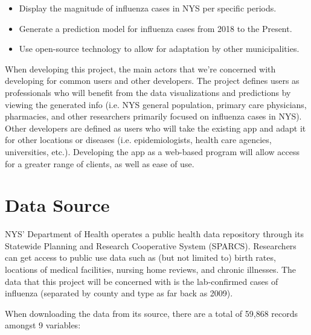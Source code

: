 \documentclass[12pt]{article}
\begin{document}
\begin{itemize}
  	\item {Display the magnitude of influenza cases in NYS per specific periods.}
  	\item {Generate a prediction model for influenza cases from 2018 to the Present.}
	\item {Use open-source technology to allow for adaptation by other municipalities.}
\end{itemize}

When developing this project, the main actors that we're concerned with developing for common users and other developers. The project defines users as professionals who will benefit from the data visualizations and predictions by viewing the generated info (i.e. NYS general population, primary care physicians, pharmacies, and other researchers primarily focused on influenza cases in NYS). Other developers are defined as users who will take the existing app and adapt it for other locations or diseases (i.e. epidemiologists, health care agencies, universities, etc.). Developing the app as a web-based program will allow access for a greater range of clients, as well as ease of use.

\section{Data Source}

NYS’ Department of Health operates a public health data repository through its Statewide Planning and Research Cooperative System (SPARCS). Researchers can get access to public use data such as (but not limited to) birth rates, locations of medical facilities, nursing home reviews, and chronic illnesses. The data that this project will be concerned with is the lab-confirmed cases of influenza (separated by county and type as far back as 2009).

When downloading the data from its source, there are a total of 59,868 records amongst 9 variables:
\end{document}
